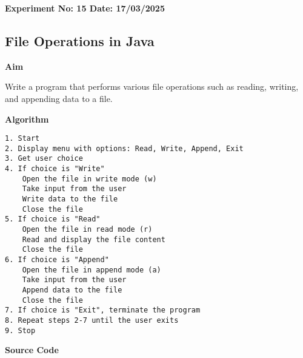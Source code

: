 \textbf{Experiment No: 15 \hfill Date: 17/03/2025}

\begin{center}
    \Large \subsection*{File Operations in Java}
\end{center}

\textbf{Aim}
\vspace{0.5cm}

Write a program that performs various file operations such as reading, writing, and appending data to a file.

\vspace{0.5cm}
\textbf{Algorithm}
\vspace{0.5cm}
\begin{verbatim}
1. Start
2. Display menu with options: Read, Write, Append, Exit
3. Get user choice
4. If choice is "Write"
    Open the file in write mode (w)
    Take input from the user
    Write data to the file
    Close the file
5. If choice is "Read"
    Open the file in read mode (r)
    Read and display the file content
    Close the file
6. If choice is "Append"
    Open the file in append mode (a)
    Take input from the user
    Append data to the file
    Close the file
7. If choice is "Exit", terminate the program
8. Repeat steps 2-7 until the user exits
9. Stop
\end{verbatim}

\vspace{0.5cm}
\textbf{Source Code}

